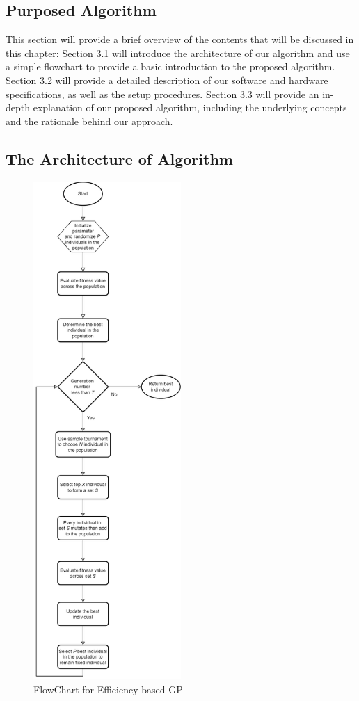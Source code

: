\begin{ZhChapter}

\chapter{Purposed Algorithm}
This section will provide a brief overview of the contents that will be discussed in this chapter: Section 3.1 will introduce the architecture of our algorithm and use a simple flowchart to provide a basic introduction to the proposed algorithm. Section 3.2 will provide a detailed description of our software and hardware specifications, as well as the setup procedures. Section 3.3 will provide an in-depth explanation of our proposed algorithm, including the underlying concepts and the rationale behind our approach.
\section{The Architecture of Algorithm} %
    \begin{figure}[htbp]
    \centering
    \includegraphics[width = 0.5\textwidth]{image/FlowChart.png}
    \caption{FlowChart for Efficiency-based GP}
    \label{fig: image}
    \end{figure}

\end{ZhChapter}
